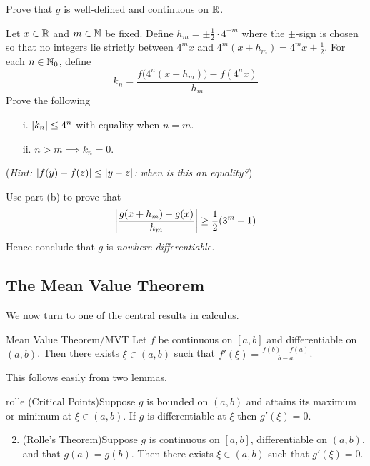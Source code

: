 \begin{tcolorbox}[exercisestyle,title={}]
\begin{description}
  \begin{enumeratea}
    \item Prove that $g$ is well-defined and continuous on $\mathbb{R}$.
    \item Let $x\in\mathbb{R}$ and $m\in\mathbb{N}$ be fixed. Define $h_m=\pm\frac 12\cdot 4^{-m}$ where the $\pm$-sign is chosen so that no integers lie strictly between $4^mx$ and $4^m(x+h_m)=4^mx\pm\frac 12$.\smallbreak
    For each $n\in\mathbb{N}_0$, define
    \[k_n =\frac{f\big(4^n(x+h_m)\big)-f(4^nx)}{h_m}\]
    Prove the following
    \begin{enumerate}
      \item[i.] $\left| k_n\right|\le 4^n$ with equality when $n=m$.
      \item[ii.] $n>m\implies k_n=0$.
    \end{enumerate}
    (\emph{Hint: $\left| f(y)-f(z)\right|\le\left| y-z\right|$: when is this an equality?})

    \item Use part (b) to prove that
    \[\left| \frac{g(x+h_m)-g(x)}{h_m}\right|\ge \frac 12(3^m+1)\]
    Hence conclude that $g$ is \emph{nowhere differentiable.}
  \end{enumeratea}
\end{description}

\end{tcolorbox}
	
\clearpage

\subsection{The Mean Value Theorem}\label{sec:mvt}

We now turn to one of the central results in calculus.

\begin{thm}{Mean Value Theorem/MVT}{}
Let $f$ be continuous on $[a,b]$ and differentiable on $(a,b)$. Then there exists $\xi\in(a,b)$ such that $\textstyle f'(\xi)=\frac{f(b)-f(a)}{b-a}$.
\end{thm}

This follows easily from two lemmas.

\begin{lemm}{}{rolle}
\exstart (Critical Points)\quad Suppose $g$ is bounded on $(a,b)$ and attains its maximum or minimum at $\xi\in(a,b)$. If $g$ is differentiable at $\xi$ then $g'(\xi)=0$. \vspace{-5pt} %
\begin{enumerate}\setcounter{enumi}{1}\itemsep0pt
  \item (Rolle's Theorem)\quad Suppose $g$ is continuous on $[a,b]$, differentiable on $(a,b)$, and that $g(a)=g(b)$. Then there exists $\xi\in(a,b)$ such that $g'(\xi)=0$. 
\end{enumerate}
\end{lemm}

